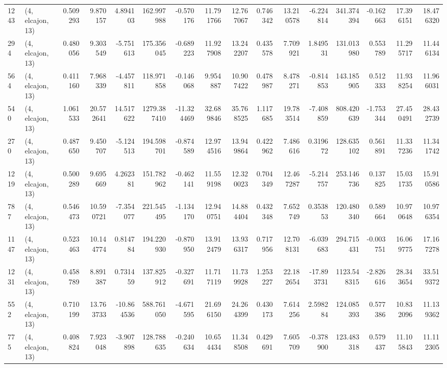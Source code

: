 \begin{tabular}{llrrrrrrrrrrrrrr}
1243 &  (4, elcajon, 13) &   0.509293 &   9.870157 &   4.894103 &    162.997988 &   -0.570176 &   11.791766 &   12.767067 &  0.746342 &  13.210578 &  -6.224814 &   341.374394 &  -0.162663 &  17.396151 &  18.476320 \\
294  &  (4, elcajon, 13) &   0.480056 &   9.303549 &  -5.751613 &    175.356045 &   -0.689223 &   11.927908 &   13.242207 &  0.435578 &   7.709921 &   1.849531 &   131.013980 &   0.553789 &  11.295717 &  11.446134 \\
564  &  (4, elcajon, 13) &   0.411160 &   7.968339 &  -4.457811 &    118.971858 &   -0.146068 &    9.954887 &   10.907422 &  0.478987 &   8.478271 &  -0.814853 &   143.185905 &   0.512333 &  11.938254 &  11.966031 \\
540  &  (4, elcajon, 13) &   1.061533 &  20.572641 &  14.517622 &   1279.387410 &  -11.324469 &   32.689846 &   35.768525 &  1.117685 &  19.783514 &  -7.408859 &   808.420639 &  -1.753344 &  27.450491 &  28.432739 \\
270  &  (4, elcajon, 13) &   0.487650 &   9.450707 &  -5.124513 &    194.598701 &   -0.874589 &   12.974516 &   13.949864 &  0.422962 &   7.486616 &   0.319672 &   128.635102 &   0.561891 &  11.337236 &  11.341742 \\
1219 &  (4, elcajon, 13) &   0.500289 &   9.695669 &   4.262381 &    151.782962 &   -0.462141 &   11.559198 &   12.320023 &  0.704349 &  12.467287 &  -5.214757 &   253.146736 &   0.137825 &  15.031735 &  15.910586 \\
787  &  (4, elcajon, 13) &   0.546473 &  10.590721 &  -7.354077 &    221.545495 &   -1.134170 &   12.940751 &   14.884404 &  0.432348 &   7.652749 &   0.353853 &   120.480340 &   0.589664 &  10.970648 &  10.976354 \\
1147 &  (4, elcajon, 13) &   0.523463 &  10.144774 &   0.814784 &    194.220930 &   -0.870950 &   13.912479 &   13.936317 &  0.717956 &  12.708131 &  -6.039683 &   294.715431 &  -0.003751 &  16.069775 &  17.167278 \\
1231 &  (4, elcajon, 13) &   0.458789 &   8.891387 &   0.731459 &    137.825912 &   -0.327691 &   11.717119 &   11.739928 &  1.253227 &  22.182654 & -17.893731 &  1123.548315 &  -2.826616 &  28.343654 &  33.519372 \\
552  &  (4, elcajon, 13) &   0.710199 &  13.763733 & -10.864536 &    588.761050 &   -4.671595 &   21.696150 &   24.264399 &  0.430173 &   7.614256 &   2.598284 &   124.085393 &   0.577386 &  10.832096 &  11.139362 \\
775  &  (4, elcajon, 13) &   0.408824 &   7.923048 &  -3.907898 &    128.788635 &   -0.240634 &   10.654434 &   11.348508 &  0.429691 &   7.605709 &  -0.378900 &   123.483318 &   0.579437 &  11.105843 &  11.112305 \\

\end{tabular}
